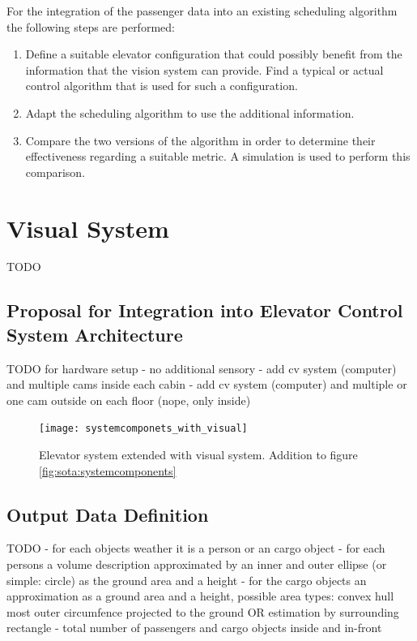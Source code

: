 For the integration of the passenger data into an existing scheduling algorithm the following steps are performed:

\begin{enumerate}
    \item Define a suitable elevator configuration that could possibly benefit from the information that the vision system can provide. 
    Find a typical or actual control algorithm that is used for such a configuration.
    \item Adapt the scheduling algorithm to use the additional information.
    \item Compare the two versions of the algorithm in order to determine their effectiveness regarding a suitable metric.
    A simulation is used to perform this comparison.
\end{enumerate}

 
\section{Visual System}
TODO
\subsection{Proposal for Integration into Elevator Control System Architecture}
TODO
for hardware setup
- no additional sensory
- add cv system (computer) and multiple cams inside each cabin
- add cv system (computer) and multiple or one cam outside on each floor (nope, only inside)

\begin{figure}
    \centering
    \texttt{[image: systemcomponets\_with\_visual]}
    \caption[Elevator system extended with visual system]{Elevator system extended with visual system. Addition to figure \ref{fig:sota:systemcomponents}}
    \label{fig:design:systeminteration}
\end{figure}

\subsection{Output Data Definition}
TODO
- for each objects weather it is a person or an cargo object
- for each persons a volume description approximated by an inner and outer ellipse (or simple: circle) as the ground area and a height
- for the cargo objects an approximation as a ground area and a height, possible area types: convex hull most outer circumfence projected to the ground OR estimation by surrounding rectangle
- total number of passengers and cargo objects inside and in-front
